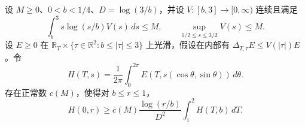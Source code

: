 设 \(M\ge0\)、\(0<b<1/4\)、\(D=\log(3/b)\)，并设 \(V:[b,3]\to[0,\infty)\) 连续且满足
\[
 \int_b^3 s\log(s/b)V(s)\,ds\le M,\qquad
 \sup_{1/2\le s\le3/2}V(s)\le M .
\]
设 \(E\ge0\) 在 \(\mathbb R_T\times\{\tau\in\mathbb R^2:b\le|\tau|\le3\}\) 上光滑，假设在内部有 \(\Delta_{T,\tau}E\le V(|\tau|)E\)。令
\[
 H(T,s)=\frac1{2\pi}\int_0^{2\pi}
    E(T,s(\cos\theta,\sin\theta))\,d\theta .
\]
存在正常数 \(c(M)\)，使得对 \(b\le r\le1\)，
\[
 H(0,r)\ge c(M)\frac{\log(r/b)}{D^2}\int_1^2H(T,b)\,dT .
\]
